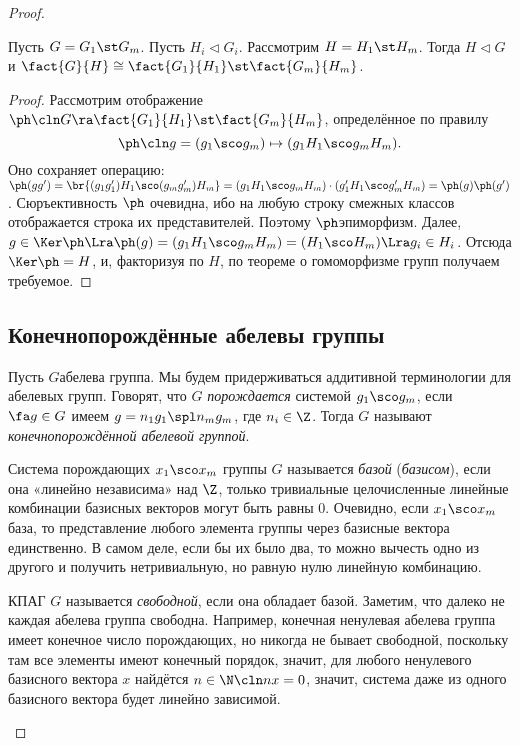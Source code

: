 \documentclass[a4paper]{article}
\newcommand{\kph}{\Ker \ph}
\begin{document}
\begin{proof}
\begin{theorem}
Пусть $G=G_1\st G_m$. Пусть $H_i \lhd G_i$. Рассмотрим $H=H_1\st H_m$.  Тогда $H \lhd G$ и $\fact{G}{H} \cong
\fact{G_1}{H_1}\st \fact{G_m}{H_m}$.
\end{theorem}
\begin{proof}
Рассмотрим отображение $\ph\cln G \ra \fact{G_1}{H_1}\st \fact{G_m}{H_m}$,
определённое по правилу
$$\ph\cln g = (g_1\sco g_m) \mapsto (g_1H_1\sco g_mH_m).$$
Оно сохраняет операцию: $\ph(gg')=\br{(g_1g_1')H_1\sco  (g_mg_m')H_m}=(g_1H_1\sco g_mH_m)\cdot(g_1'H_1\sco
g_m'H_m)=\ph(g)\ph(g')$. Сюръективность $\ph$ очевидна, ибо на любую строку смежных классов отображается
строка их представителей. Поэтому $\ph$\т эпиморфизм. Далее, $g \in \kph \Lra \ph(g)= (g_1H_1\sco
g_mH_m)=(H_1\sco H_m) \Lra g_i \in H_i$. Отсюда $\kph = H$, и, факторизуя по $H$, по теореме о гомоморфизме
групп получаем требуемое.
\end{proof}

\subsection{Конечнопорождённые абелевы группы}

\begin{df}
Пусть $G$\т абелева группа. Мы будем придерживаться аддитивной  терминологии для абелевых групп. Говорят, что
$G$ \emph{порождается} системой $g_1\sco g_m$, если $\fa g \in G$ имеем $g=n_1g_1 \spl n_mg_m$, где $n_i \in
\Z$. Тогда $G$ называют \emph{конечнопорождённой абелевой группой}.
\end{df}

\begin{df}
Система порождающих $x_1\sco x_m$ группы $G$ называется \emph{базой}  (\emph{базисом}), если она «линейно
независима» над $\Z$,  только тривиальные целочисленные линейные комбинации базисных векторов могут быть
равны 0. Очевидно, если $x_1\sco x_m$\т база, то представление любого элемента группы через базисные вектора
единственно. В самом деле, если бы их было два, то можно вычесть одно из другого и получить нетривиальную, но
равную нулю линейную комбинацию.
\end{df}

\begin{df}
КПАГ $G$ называется \emph{свободной}, если она обладает базой. Заметим,  что далеко не каждая абелева группа
свободна. Например, конечная ненулевая абелева группа имеет конечное число порождающих, но никогда не бывает
свободной, поскольку там все элементы имеют конечный порядок, значит, для любого ненулевого базисного вектора
$x$ найдётся $n \in \N\cln nx=0$, значит, система даже из одного базисного вектора будет линейно зависимой.
\end{df}


\end{proof}
\end{document}
